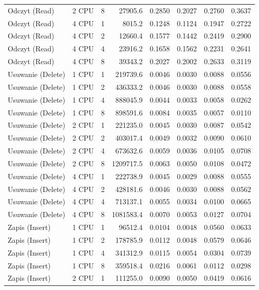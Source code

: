 \begin{table}[ht]
{\begin{tabular}{llcrrrrr}
Odczyt (Read) & 2 CPU & 8 & 27905.6 & 0.2850 & 0.2027 & 0.2760 & 0.3637 \\
Odczyt (Read) & 4 CPU & 1 & 8015.2 & 0.1248 & 0.1124 & 0.1947 & 0.2722 \\
Odczyt (Read) & 4 CPU & 2 & 12660.4 & 0.1577 & 0.1442 & 0.2419 & 0.2900 \\
Odczyt (Read) & 4 CPU & 4 & 23916.2 & 0.1658 & 0.1562 & 0.2231 & 0.2641 \\
Odczyt (Read) & 4 CPU & 8 & 39343.2 & 0.2027 & 0.2002 & 0.2633 & 0.3119 \\
Usuwanie (Delete) & 1 CPU & 1 & 219739.6 & 0.0046 & 0.0030 & 0.0088 & 0.0556 \\
Usuwanie (Delete) & 1 CPU & 2 & 436333.2 & 0.0046 & 0.0030 & 0.0088 & 0.0558 \\
Usuwanie (Delete) & 1 CPU & 4 & 888045.9 & 0.0044 & 0.0033 & 0.0058 & 0.0262 \\
Usuwanie (Delete) & 1 CPU & 8 & 898591.6 & 0.0084 & 0.0035 & 0.0057 & 0.0110 \\
Usuwanie (Delete) & 2 CPU & 1 & 221235.0 & 0.0045 & 0.0030 & 0.0087 & 0.0542 \\
Usuwanie (Delete) & 2 CPU & 2 & 403017.4 & 0.0049 & 0.0032 & 0.0090 & 0.0610 \\
Usuwanie (Delete) & 2 CPU & 4 & 673632.6 & 0.0059 & 0.0036 & 0.0105 & 0.0708 \\
Usuwanie (Delete) & 2 CPU & 8 & 1209717.5 & 0.0063 & 0.0050 & 0.0108 & 0.0472 \\
Usuwanie (Delete) & 4 CPU & 1 & 222738.9 & 0.0045 & 0.0029 & 0.0088 & 0.0555 \\
Usuwanie (Delete) & 4 CPU & 2 & 428181.6 & 0.0046 & 0.0030 & 0.0088 & 0.0562 \\
Usuwanie (Delete) & 4 CPU & 4 & 713137.1 & 0.0055 & 0.0034 & 0.0100 & 0.0665 \\
Usuwanie (Delete) & 4 CPU & 8 & 1081583.4 & 0.0070 & 0.0053 & 0.0127 & 0.0704 \\
Zapis (Insert) & 1 CPU & 1 & 96512.4 & 0.0104 & 0.0048 & 0.0560 & 0.0633 \\
Zapis (Insert) & 1 CPU & 2 & 178785.9 & 0.0112 & 0.0048 & 0.0579 & 0.0646 \\
Zapis (Insert) & 1 CPU & 4 & 341312.9 & 0.0115 & 0.0054 & 0.0304 & 0.0739 \\
Zapis (Insert) & 1 CPU & 8 & 359518.4 & 0.0216 & 0.0061 & 0.0112 & 0.0298 \\
Zapis (Insert) & 2 CPU & 1 & 111255.0 & 0.0090 & 0.0050 & 0.0419 & 0.0616 \\

\end{tabular}}
\end{table}
